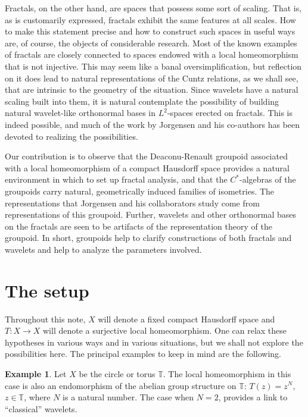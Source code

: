 \documentclass{amsproc}
\theoremstyle{plain}
\theoremstyle{definition}
\newtheorem{example}[thm]{Example}
\theoremstyle{definition}
\theoremstyle{remark}
\theoremstyle{plain}
\begin{document}
Fractals, on the other hand, are spaces that possess some sort of
scaling. That is, as is customarily expressed, fractals exhibit the
same features at all scales. How to make this statement precise and
how to construct such spaces in useful ways are, of course, the objects
of considerable research. Most of the known examples of fractals are
closely connected to spaces endowed with a local homeomorphism that
is not injective. This may seem like a banal oversimplification, but
reflection on it does lead to natural representations of the Cuntz
relations, as we shall see, that are intrinsic to the geometry of
the situation. Since wavelets have a natural scaling built into them,
it is natural contemplate the possibility of building natural wavelet-like
orthonormal bases in $L^{2}$-spaces erected on fractals. This is
indeed possible, and much of the work by Jorgensen and his co-authors
has been devoted to realizing the possibilities.

Our contribution is to observe that the Deaconu-Renault groupoid associated
with a local homeomorphism of a compact Hausdorff space provides a
natural environment in which to set up fractal analysis, and that
the $C^{*}$-algebras of the groupoids carry natural, geometrically
induced families of isometries. The representations that Jorgensen
and his collaborators study come from representations of this groupoid.
Further, wavelets and other orthonormal bases on the fractals are
seen to be artifacts of the representation theory of the groupoid.
In short, groupoids help to clarify constructions of both fractals
and wavelets and help to analyze the parameters involved.


\section{The setup}

Throughout this note, $X$ will denote a fixed compact Hausdorff space
and $T:X\rightarrow X$ will denote a surjective local homeomorphism.
One can relax these hypotheses in various ways and in various situations,
but we shall not explore the possibilities here. The principal examples
to keep in mind are the following.

\begin{example}
Let $X$ be the circle or torus $\mathbb{T}$. The local homeomorphism
in this case is also an endomorphism of the abelian group structure
on $\mathbb{T}$: $T(z)=z^{N},$ $z\in\mathbb{T}$, where $N$ is
a natural number. The case when $N=2$, provides a link to {}``classical''
wavelets. 
\end{example}
\end{document}

